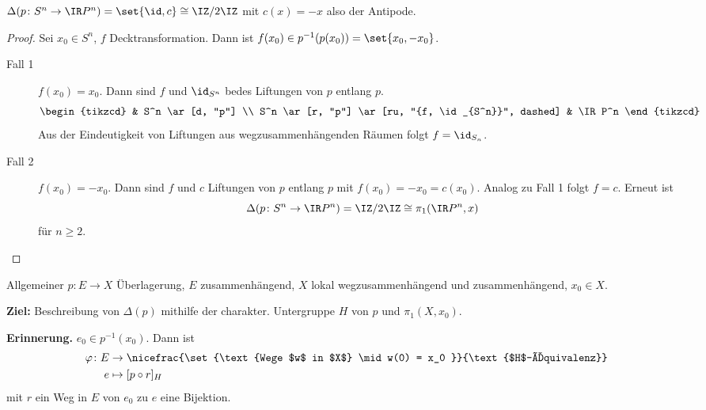 \documentclass[language=ngerman]{TemplateLecture} %
\begin{document}


\begin{example}
    \(\Delta(p \colon S^n \to \IR P^n) = \set{\id, c} \cong \IZ/2\IZ\) mit \(c(x) = -x\) also der Antipode.
    \begin{proof}
        Sei \(x_0 \in S^n\), \(f\) Decktransformation. Dann ist \(f(x_0) \in p^{-1}(p(x_0)) = \set{x_0, -x_0}\).
        \begin{description}
            \item[Fall 1] \(f(x_0) = x_0\). Dann sind \(f\) und \(\id_{S^n}\) bedes Liftungen von \(p\) entlang \(p\).
            \[\begin{tikzcd}
                & S^n \ar[d, "p"] \\
                S^n \ar[r, "p"] \ar[ru, "{f, \id_{S^n}}", dashed] & \IR P^n
            \end{tikzcd}\]
            Aus der Eindeutigkeit von Liftungen aus wegzusammenhängenden Räumen folgt \(f = \id_{S_n}\).
            \item[Fall 2] \(f(x_0) = -x_0\). Dann sind \(f\) und \(c\) Liftungen von \(p\) entlang \(p\) mit \(f(x_0) = -x_0 = c(x_0)\). Analog zu Fall 1 folgt \(f = c\). Erneut ist
            \[\Delta(p\colon S^n \to \IR P^n) = \IZ/2\IZ \cong \pi_1(\IR P^n, x)\]
            für \(n \geq 2\).
        \end{description}
    \end{proof}
\end{example}

Allgemeiner \(p \colon E\to X\) Überlagerung, \(E\) zusammenhängend, \(X\) lokal wegzusammenhängend und zusammenhängend, \(x_0 \in X\).

\textbf{Ziel:} Beschreibung von \(\Delta(p)\) mithilfe der charakter. Untergruppe \(H\) von \(p\) und \(\pi_1(X, x_0)\).

\textbf{Erinnerung.} \(e_0 \in p^{-1}(x_0)\). Dann ist
\[\begin{split}
    \varphi\colon E &\to \nicefrac{\set{\text{Wege $w$ in $X$} \mid w(0) = x_0 }}{\text{$H$-Äquivalenz}} \\
    e&\mapsto [p \circ r]_H
\end{split}\]
mit \(r\) ein Weg in \(E\) von \(e_0\) zu \(e\) eine Bijektion.
\end{document}
